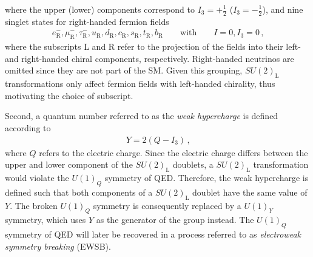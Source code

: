 where the upper (lower) components correspond to $I_3 = +\frac{1}{2}$
($I_3 = -\frac{1}{2}$), and nine singlet states for right-handed fermion fields
\begin{align*}
  e^{-}_{\text{R}}, \mu^{-}_{\text{R}}, \tau^{-}_{\text{R}},
  u_{\text{R}}, d_{\text{R}}, c_{\text{R}}, s_{\text{R}}, t_{\text{R}}, b_{\text{R}}
  \qquad
  \text{with}
  \qquad
  I = 0, I_3 = 0 \,\text{,}
\end{align*}
where the subscripts L and R refer to the projection of the fields into their
left- and right-handed chiral components,
respectively. %
Right-handed neutrinos are omitted since they are not part of the SM.
Given this grouping, $SU(2)_{\text{L}}$ transformations only affect fermion
fields with left-handed chirality, thus motivating the choice of subscript.

Second, a quantum number referred to as the \emph{weak hypercharge} is defined
according to
\begin{align*}
  Y = 2 (Q - I_3) \,\text{,}
\end{align*}
where $Q$ refers to the electric charge. Since the electric charge differs
between the upper and lower component of the $SU(2)_{\text{L}}$ doublets, a
$SU(2)_{\text{L}}$ transformation would violate the $U(1)_Q$ symmetry of
QED. Therefore, the weak hypercharge is defined such that both components of a
$SU(2)_{\text{L}}$ doublet have the same value of $Y$. The broken $U(1)_Q$
symmetry is consequently replaced by a $U(1)_Y$ symmetry, which uses $Y$ as the
generator of the group instead. The $U(1)_Q$ symmetry of QED will later be
recovered in a process referred to as \emph{electroweak symmetry breaking}
(EWSB).

